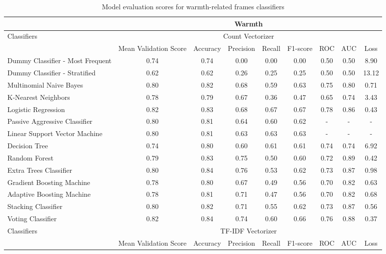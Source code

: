 \documentclass[Royal,sageapa,times]{sagej}
\begin{document}
\begin{landscape}
    \begin{longtable}[l]{lcccccccc}
    \caption{Model evaluation scores for warmth-related frames classifiers}
    \label{table10}
    \hline
    & \multicolumn{8}{c}{Warmth} \\ \hline
    \endhead
    \multirow{2}{*}{Classifiers} & \multicolumn{8}{c}{Count Vectorizer} \\ \cline{2-9}
    & Mean   Validation Score & Accuracy & Precision & Recall & F1-score & ROC & AUC & Loss \\ \hline
    Dummy Classifier - Most   Frequent & 0.74 & 0.74 & 0.00 & 0.00 & 0.00 & 0.50 & 0.50 & 8.90 \\
    Dummy Classifier - Stratified & 0.62 & 0.62 & 0.26 & 0.25 & 0.25 & 0.50 & 0.50 & 13.12 \\
    Multinomial Naive Bayes & 0.80 & 0.82 & 0.68 & 0.59 & 0.63 & 0.75 & 0.80 & 0.71 \\
    K-Nearest Neighbors & 0.78 & 0.79 & 0.67 & 0.36 & 0.47 & 0.65 & 0.74 & 3.43 \\
    Logistic Regression & 0.82 & 0.83 & 0.68 & 0.67 & 0.67 & 0.78 & 0.86 & 0.43 \\
    Passive Aggressive Classifier & 0.80 & 0.81 & 0.64 & 0.60 & 0.62 & - & - & - \\
    Linear Support Vector Machine & 0.80 & 0.81 & 0.63 & 0.63 & 0.63 & - & - & - \\
    Decision Tree & 0.74 & 0.80 & 0.60 & 0.61 & 0.61 & 0.74 & 0.74 & 6.92 \\
    Random Forest & 0.79 & 0.83 & 0.75 & 0.50 & 0.60 & 0.72 & 0.89 & 0.42 \\
    Extra Trees Classifier & 0.80 & 0.84 & 0.76 & 0.53 & 0.62 & 0.73 & 0.87 & 0.98 \\
    Gradient Boosting Machine & 0.78 & 0.80 & 0.67 & 0.49 & 0.56 & 0.70 & 0.82 & 0.63 \\
    Adaptive Boosting Machine & 0.78 & 0.81 & 0.71 & 0.47 & 0.56 & 0.70 & 0.82 & 0.68 \\
    Stacking Classifier & 0.80 & 0.82 & 0.71 & 0.55 & 0.62 & 0.73 & 0.87 & 0.56 \\
    Voting Classifier & 0.82 & 0.84 & 0.74 & 0.60 & 0.66 & 0.76 & 0.88 & 0.37 \\ \hline
    \multirow{2}{*}{Classifiers} & \multicolumn{8}{c}{TF-IDF Vectorizer} \\ \cline{2-9}
    & Mean   Validation Score & Accuracy & Precision & Recall & F1-score & ROC & AUC & Loss \\ \hline

\end{longtable}
\end{landscape}
\end{document}
